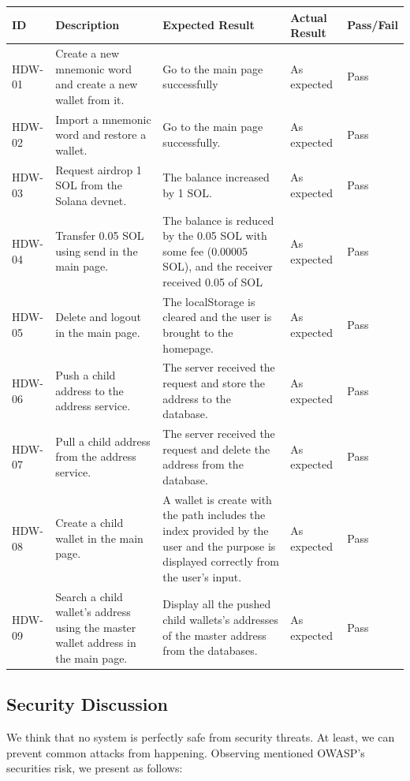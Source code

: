 \begin{tabular}{ m{1.5cm} m{4.5cm} m{5cm} m{3cm} m{1.5cm}}
    \toprule
    ID & Description & Expected Result & Actual Result & Pass/Fail                                            \\ 
    \midrule
    HDW-01 & Create a new mnemonic word and create a new wallet from it. & Go to the main page successfully & As expected & Pass \\ 
    HDW-02 & Import a mnemonic word and restore a wallet.  &  Go to the main page successfully. & As expected & Pass  \\ 
    HDW-03 & Request airdrop 1 SOL from the Solana devnet. &  The balance increased by 1 SOL. & As expected & Pass    \\ 
    HDW-04 & Transfer 0.05 SOL using send in the main page. &  The balance is reduced by the 0.05 SOL with some fee (0.00005 SOL), and the receiver received 0.05 of SOL & As expected & Pass   \\ 
    HDW-05 & Delete and logout in the main page. &  The localStorage is cleared and the user is brought to the homepage. & As expected & Pass   \\ 
    HDW-06 & Push a child address to the address service.&  The server received the request and store the address to the database. & As expected & Pass   \\ 
    HDW-07 & Pull a child address from the address service.&  The server received the request and delete the address from the database. & As expected & Pass   \\ 
    HDW-08 & Create a child wallet in the main page.&  A wallet is create with the path includes the index provided by the user and the purpose is displayed correctly from the user's input. & As expected & Pass   \\ 
    HDW-09 & Search a child wallet's address using the master wallet address in the main page.& Display all the pushed child wallets's addresses of the master address from the databases. & As expected & Pass   \\ 
    \bottomrule
\end{tabular}
\subsection{Security Discussion}

We think that no system is perfectly safe from security threats. At least, we can prevent common attacks from happening. Observing mentioned OWASP’s securities risk, we present as follows:

